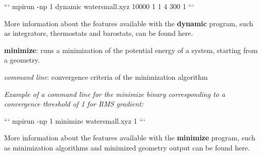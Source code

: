 ``` mpirun -\/np 1 dynamic watersmall.\-xyz 10000 1 1 4 300 1 ```

More information about the features available with the {\bfseries dynamic} program, such as integrators, thermostats and barostats, can be found here.


\begin{DoxyEnumerate}
\item {\bfseries minimize}\-: runs a minimization of the potential energy of a system, starting from a geometry.
\begin{DoxyItemize}
\item {\itshape command line}\-: convergence criteria of the minimization algorithm
\end{DoxyItemize}
\end{DoxyEnumerate}

{\itshape Example of a command line for the minimize binary corresponding to a convergence threshold of 1 for R\-M\-S gradient\-:}

``` mpirun -\/np 1 minimize watersmall.\-xyz 1 ```

More information about the features available with the {\bfseries minimize} program, such as minimization algorithms and minimized geometry output can be found here.


